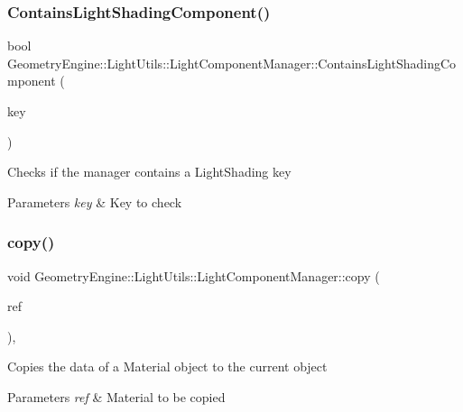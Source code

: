 \subsubsection{\texorpdfstring{ContainsLightShadingComponent()}{ContainsLightShadingComponent()}}
{\footnotesize\ttfamily bool Geometry\+Engine\+::\+Light\+Utils\+::\+Light\+Component\+Manager\+::\+Contains\+Light\+Shading\+Component (\begin{DoxyParamCaption}\item[{\mbox{\hyperlink{namespace_geometry_engine_1_1_light_utils_a16eb370137c2fd151e6f8e1d07cd23e0}{Light\+Shading}}}]{key }\end{DoxyParamCaption})\hspace{0.3cm}{\ttfamily [inline]}}

Checks if the manager contains a Light\+Shading key 
\begin{DoxyParams}{Parameters}
{\em key} & Key to check \\
\hline
\end{DoxyParams}
\mbox{\label{class_geometry_engine_1_1_light_utils_1_1_light_component_manager_a5641d12a923d4868e3e65613de335857}} 
\subsubsection{\texorpdfstring{copy()}{copy()}}
{\footnotesize\ttfamily void Geometry\+Engine\+::\+Light\+Utils\+::\+Light\+Component\+Manager\+::copy (\begin{DoxyParamCaption}\item[{const \mbox{\hyperlink{class_geometry_engine_1_1_light_utils_1_1_light_component_manager}{Light\+Component\+Manager}} \&}]{ref }\end{DoxyParamCaption})\hspace{0.3cm}{\ttfamily [protected]}, {\ttfamily [virtual]}}

Copies the data of a Material object to the current object 
\begin{DoxyParams}{Parameters}
{\em ref} & Material to be copied \\
\hline
\end{DoxyParams}
\mbox{\label{class_geometry_engine_1_1_light_utils_1_1_light_component_manager_a1d15d69445169347c1492609a427d0b4}} 
